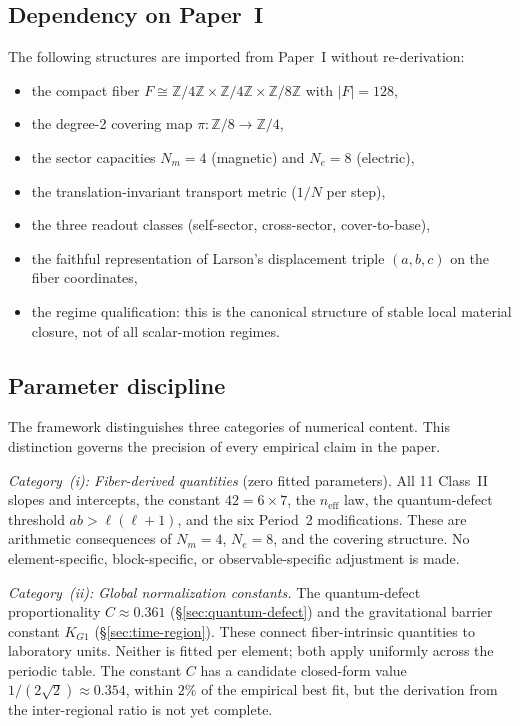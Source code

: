 \documentclass[11pt,a4paper]{article}
\begin{document}
\subsection{Dependency on Paper~I}

The following structures are imported from Paper~I without re-derivation:
\begin{itemize}
\item the compact fiber $F \cong \mathbb{Z}/4\mathbb{Z} \times \mathbb{Z}/4\mathbb{Z} \times \mathbb{Z}/8\mathbb{Z}$ with $|F| = 128$,
\item the degree-2 covering map $\pi: \mathbb{Z}/8 \to \mathbb{Z}/4$,
\item the sector capacities $N_m = 4$ (magnetic) and $N_e = 8$ (electric),
\item the translation-invariant transport metric ($1/N$ per step),
\item the three readout classes (self-sector, cross-sector, cover-to-base),
\item the faithful representation of Larson's displacement triple $(a, b, c)$ on the fiber coordinates,
\item the regime qualification: this is the canonical structure of stable local material closure, not of all scalar-motion regimes.
\end{itemize}

\subsection{Parameter discipline}
\label{sec:param-discipline}

The framework distinguishes three categories of numerical content. This distinction governs the precision of every empirical claim in the paper.

\emph{Category~(i): Fiber-derived quantities} (zero fitted parameters). All 11 Class~II slopes and intercepts, the constant $42 = 6\times 7$, the $n_{\mathrm{eff}}$ law, the quantum-defect threshold $ab > \ell(\ell+1)$, and the six Period~2 modifications. These are arithmetic consequences of $N_m = 4$, $N_e = 8$, and the covering structure. No element-specific, block-specific, or observable-specific adjustment is made.

\emph{Category~(ii): Global normalization constants.} The quantum-defect proportionality $C \approx 0.361$ (\S\ref{sec:quantum-defect}) and the gravitational barrier constant $K_{G1}$ (\S\ref{sec:time-region}). These connect fiber-intrinsic quantities to laboratory units. Neither is fitted per element; both apply uniformly across the periodic table. The constant $C$ has a candidate closed-form value $1/(2\sqrt{2}) \approx 0.354$, within $2\%$ of the empirical best fit, but the derivation from the inter-regional ratio is not yet complete.
\end{document}
